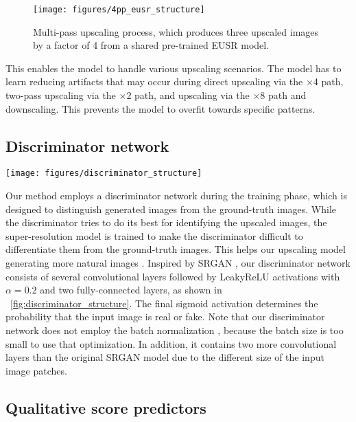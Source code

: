 \documentclass[runningheads]{llncs}
\begin{document}
\begin{figure}[t]
	\centering
	\texttt{[image: figures/4pp\_eusr\_structure]}
	\caption{Multi-pass upscaling process, which produces three upscaled images by a factor of 4 from a shared pre-trained EUSR model.}
	\label{fig:4pp_eusr_structure}
\end{figure}

This enables the model to handle various upscaling scenarios.
The model has to learn reducing artifacts that may occur during direct upscaling via the $\times$4 path, two-pass upscaling via the $\times$2 path, and upscaling via the $\times$8 path and downscaling.
This prevents the model to overfit towards specific patterns.


\subsection{Discriminator network}
\label{sec:discriminator}

\begin{figure*}[t]
	\centering
	\texttt{[image: figures/discriminator\_structure]}
	\caption{Structure of the discriminator network.}
	\label{fig:discriminator_structure}
\end{figure*}

Our method employs a discriminator network during the training phase, which is designed to distinguish generated images from the ground-truth images.
While the discriminator tries to do its best for identifying the upscaled images, the super-resolution model is trained to make the discriminator difficult to differentiate them from the ground-truth images.
This helps our upscaling model generating more natural images \cite{ledig2017photo,mechrez2018learning}.
Inspired by SRGAN \cite{ledig2017photo}, our discriminator network consists of several convolutional layers followed by LeakyReLU activations with $\alpha = 0.2$ and two fully-connected layers, as shown in \figurename~\ref{fig:discriminator_structure}.
The final sigmoid activation determines the probability that the input image is real or fake.
Note that our discriminator network does not employ the batch normalization \cite{ioffe2015batch}, because the batch size is too small to use that optimization.
In addition, it contains two more convolutional layers than the original SRGAN model due to the different size of the input image patches.


\subsection{Qualitative score predictors}
\label{sec:qualitative_score_predictors}
\end{document}
